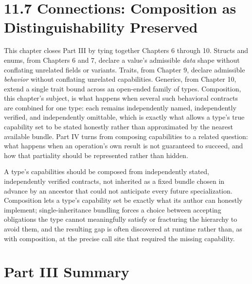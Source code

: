 \documentclass[11pt]{book}
\begin{document}
\section*{11.7 Connections: Composition as Distinguishability Preserved}

This chapter closes Part III by tying together Chapters 6 through 10. Structs and enums, from Chapters 6 and 7, declare a value's admissible \emph{data} shape without conflating unrelated fields or variants. Traits, from Chapter 9, declare admissible \emph{behavior} without conflating unrelated capabilities. Generics, from Chapter 10, extend a single trait bound across an open-ended family of types. Composition, this chapter's subject, is what happens when several such behavioral contracts are combined for one type: each remains independently named, independently verified, and independently omittable, which is exactly what allows a type's true capability set to be stated honestly rather than approximated by the nearest available bundle. Part IV turns from composing capabilities to a related question: what happens when an operation's own result is not guaranteed to succeed, and how that partiality should be represented rather than hidden.

\begin{invariantbox}
A type's capabilities should be composed from independently stated, independently verified contracts, not inherited as a fixed bundle chosen in advance by an ancestor that could not anticipate every future specialization. Composition lets a type's capability set be exactly what its author can honestly implement; single-inheritance bundling forces a choice between accepting obligations the type cannot meaningfully satisfy or fracturing the hierarchy to avoid them, and the resulting gap is often discovered at runtime rather than, as with composition, at the precise call site that required the missing capability.
\end{invariantbox}

\clearpage

\clearpage

\section*{Part III Summary}
\end{document}
